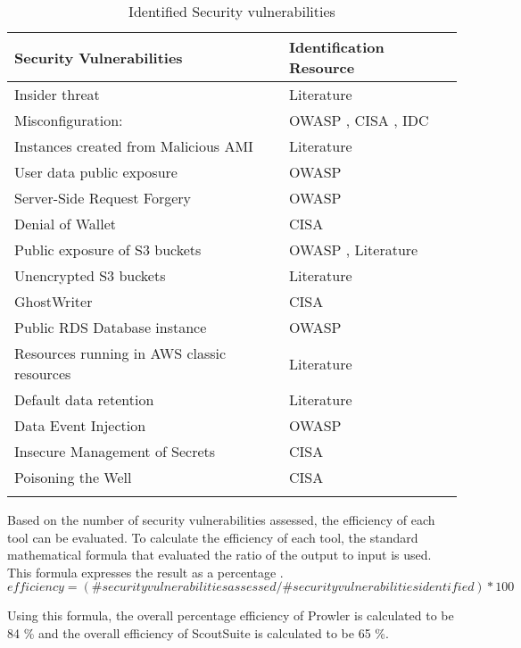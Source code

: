 \begin{longtable}{|p{9cm}|p{4.2cm}|}
    \hline
    \textbf{Security Vulnerabilities} & \textbf{Identification Resource}\\
    \hline
    Insider threat & Literature \cite{93} \\
    \hline
    Misconfiguration: & OWASP \cite{51}, CISA \cite{52}, IDC \cite{53} \\
    \hline
    Instances created from Malicious AMI & Literature \cite{58} \\
    \hline
    User data public exposure & OWASP \cite{51} \\
    \hline
    Server-Side Request Forgery & OWASP \cite{51} \\
    \hline
    Denial of Wallet & CISA \cite{52} \\
    \hline
    Public exposure of S3 buckets & OWASP \cite{51}, Literature
    \cite{94}\\
    \hline
    Unencrypted S3 buckets & Literature \cite{95}\\
    \hline
    GhostWriter & CISA \cite{52} \\
    \hline
    Public RDS Database instance & OWASP \cite{51} \\
    \hline
    Resources running in AWS classic resources &
    Literature \cite{96}\\
    \hline
    Default data retention & Literature \cite{97} \\
    \hline
    Data Event Injection & OWASP \cite{51} \\
    \hline
    Insecure Management of Secrets & CISA \cite{52} \\
    \hline
    Poisoning the Well & CISA \cite{52} \\
    \hline
    \caption{Identified Security vulnerabilities}
    \label{tab:securityvulnerabilitiesandresources}
\end{longtable}

\par Based on the number of security vulnerabilities assessed, the efficiency of each tool can be evaluated.
To calculate the efficiency of each tool, the standard mathematical formula that evaluated the ratio of the output to input is used.
This formula expresses the result as a percentage \cite{98}.
\[ efficiency = (\# security
vulnerabilities assessed/\# security
vulnerabilities identified) * 100 \]

Using this formula, the overall percentage efficiency of Prowler is calculated to be 84 \% and the overall efficiency of ScoutSuite is calculated to be 65 \%.

